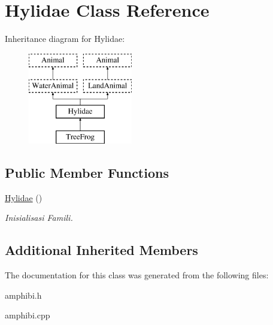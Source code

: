\hypertarget{class_hylidae}{}\section{Hylidae Class Reference}
\label{class_hylidae}
Inheritance diagram for Hylidae\+:\begin{figure}[H]
\begin{center}
\leavevmode
\includegraphics[height=4.000000cm]{class_hylidae}
\end{center}
\end{figure}
\subsection*{Public Member Functions}
\begin{DoxyCompactItemize}
\item 
\hyperlink{class_hylidae_a101a20f7cf2649e0b7061d0684903a3a}{Hylidae} ()\hypertarget{class_hylidae_a101a20f7cf2649e0b7061d0684903a3a}{}\label{class_hylidae_a101a20f7cf2649e0b7061d0684903a3a}

\begin{DoxyCompactList}\small\item\em Inisialisasi Famili. \end{DoxyCompactList}\end{DoxyCompactItemize}
\subsection*{Additional Inherited Members}


The documentation for this class was generated from the following files\+:\begin{DoxyCompactItemize}
\item 
amphibi.\+h\item 
amphibi.\+cpp\end{DoxyCompactItemize}
